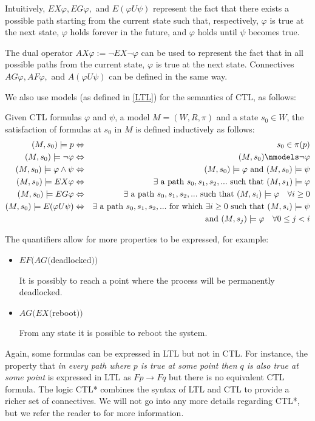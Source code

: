 \documentclass[11pt]{article}
\newenvironment{definition}[1][Definition]{\begin{trivlist}
\item[\hskip \labelsep {\bfseries #1}]}{\end{trivlist}}
\begin{document}
Intuitively, $ EX\varphi,  EG\varphi,$ and $ E(\varphi U \psi)$ represent the fact that there exists a possible path starting from the current state such that, respectively, $\varphi$ is true at the next state, $\varphi$ holds forever in the future, and $\varphi$ holds until $\psi$ becomes true.

The dual operator $AX\varphi := \lnot EX \lnot\varphi $ can be used to represent the fact that in all possible paths from the current state, $\varphi$ is true at the next state.
Connectives $AG\varphi, AF\varphi,$ and $A(\varphi U\psi)$ can be defined in the same way. 

We also use models (as defined in \ref{LTL}) for the semantics of CTL, as follows:

\begin{definition} 
Given CTL formulas $\varphi$ and $\psi$, a model $M = (W, R, \pi)$ and a state $s_0 \in W$, the satisfaction of formulas at $s_0$ in $M$ is defined inductively as follows: 
\begin{eqnarray*}
(M, s_0) \models p &\Leftrightarrow& s_0 \in \pi(p) \\  
(M, s_0) \models \lnot \varphi &\Leftrightarrow& (M, s_0) \nmodels \lnot \varphi\\
(M, s_0) \models \varphi \land \psi &\Leftrightarrow& (M, s_0) \models \varphi \mbox{ and  } (M, s_0) \models \psi \\
(M, s_0) \models EX\varphi &\Leftrightarrow& \exists \mbox{ a path } s_0, s_1, s_2, ... \mbox{ such that } (M, s_1) \models \varphi \\
(M, s_0) \models EG\varphi &\Leftrightarrow& \exists \mbox{ a path } s_0, s_1, s_2, ... \mbox{ such that } (M, s_i) \models \varphi \quad \forall i \geq 0\\
(M, s_0) \models E(\varphi U\psi) &\Leftrightarrow&  \exists \mbox{ a path } s_0, s_1, s_2, ... \mbox{ for which } \exists i \geq 0 \mbox{ such that }  (M, s_i) \models \psi \\ && \mbox{ and }  (M, s_j) \models \varphi \quad \forall 0 \leq j < i
\end{eqnarray*}
\end{definition}
The quantifiers allow for more properties to be expressed, for example:
\begin{itemize}

\item $EF(AG($deadlocked$))$

It is possibly to reach a point where the process will be permanently deadlocked.

\item $AG(EX($reboot$))$ 

From any state it is possible to reboot the system.


\end{itemize}
Again, some formulas can be expressed in LTL but not in CTL. For instance, the property that \textit{in every path where $p$ is true at some point then $q$ is also true at some point} is expressed in LTL as $Fp \rightarrow Fq $ but there is no equivalent CTL formula.
 The logic CTL* combines the syntax of LTL and CTL to provide a richer set of connectives. We will not go into any more details regarding CTL*, but we refer the reader to \cite{ctl*} for more information. 
\end{document}
